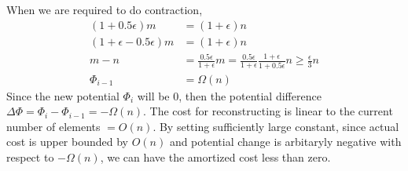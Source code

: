 \documentclass[12pt]{article}
\begin{document}
\begin{enumerate}
When we are required to do contraction, 
$$
\begin{aligned}
(1+0.5\epsilon)m &= (1+\epsilon)n \\
(1+\epsilon-0.5\epsilon)m &= (1+\epsilon)n \\
m-n &= \frac{0.5\epsilon}{1+\epsilon}m = \frac{0.5\epsilon}{1+\epsilon}\frac{1+\epsilon}{1+0.5\epsilon}n\ge \frac{\epsilon}{3}n \\
\Phi_{i-1} &= \Omega(n)
\end{aligned}
$$
Since the new potential $\Phi_i$ will be $0$,
then the potential difference $\Delta \Phi = \Phi_i - \Phi_{i-1} = -\Omega(n)$.
The cost for reconstructing is linear to the current number of elements $= O(n)$.
By setting sufficiently large constant,
since actual cost is upper bounded by $O(n)$ and potential change is arbitaryly negative with respect to $-\Omega(n)$,
we can have the amortized cost less than zero.

\end{enumerate}
\end{document}
